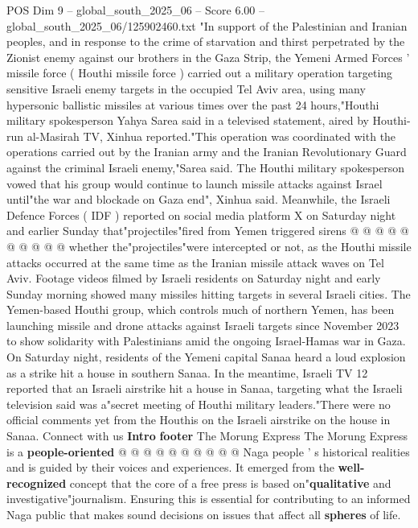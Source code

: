 \begin{textsample}{POS Dim 9 – global\_south\_2025\_06 – Score 6.00 – global\_south\_2025\_06/125902460.txt}  \label{ex:f9_pos_172}
"In support of the Palestinian and Iranian peoples, and in response to the crime of starvation and thirst perpetrated by the Zionist enemy against our brothers in the Gaza Strip, the Yemeni Armed Forces ' missile force ( Houthi missile force ) carried out a military operation targeting sensitive Israeli enemy targets in the occupied Tel Aviv area, using many hypersonic ballistic missiles at various times over the past 24 hours,"Houthi military spokesperson Yahya Sarea said in a televised statement, aired by Houthi-run al-Masirah TV, Xinhua reported."This operation was coordinated with the operations carried out by the Iranian army and the Iranian Revolutionary Guard against the criminal Israeli enemy,"Sarea said.
The Houthi military spokesperson vowed that his group would continue to launch missile attacks against Israel until"the war and blockade on Gaza end", Xinhua said.
Meanwhile, the Israeli Defence Forces ( IDF ) reported on social media platform X on Saturday night and earlier Sunday that"projectiles"fired from Yemen triggered sirens @ @ @ @ @ @ @ @ @ @ whether the"projectiles"were intercepted or not, as the Houthi missile attacks occurred at the same time as the Iranian missile attack waves on Tel Aviv.
Footage videos filmed by Israeli residents on Saturday night and early Sunday morning showed many missiles hitting targets in several Israeli cities.
The Yemen-based Houthi group, which controls much of northern Yemen, has been launching missile and drone attacks against Israeli targets since November 2023 to show solidarity with Palestinians amid the ongoing Israel-Hamas war in Gaza.
On Saturday night, residents of the Yemeni capital Sanaa heard a loud explosion as a strike hit a house in southern Sanaa.
In the meantime, Israeli TV 12 reported that an Israeli airstrike hit a house in Sanaa, targeting what the Israeli television said was a"secret meeting of Houthi military leaders."There were no official comments yet from the Houthis on the Israeli airstrike on the house in Sanaa.
Connect with us \textbf{Intro} \textbf{footer} The Morung Express The Morung Express is a \textbf{people-oriented} @ @ @ @ @ @ @ @ @ @ Naga people ' s historical realities and is guided by their voices and experiences.
It emerged from the \textbf{well-recognized} concept that the core of a free press is based on"\textbf{qualitative} and investigative"journalism.
Ensuring this is essential for contributing to an informed Naga public that makes sound decisions on issues that affect all \textbf{spheres} of life.

\end{textsample}
